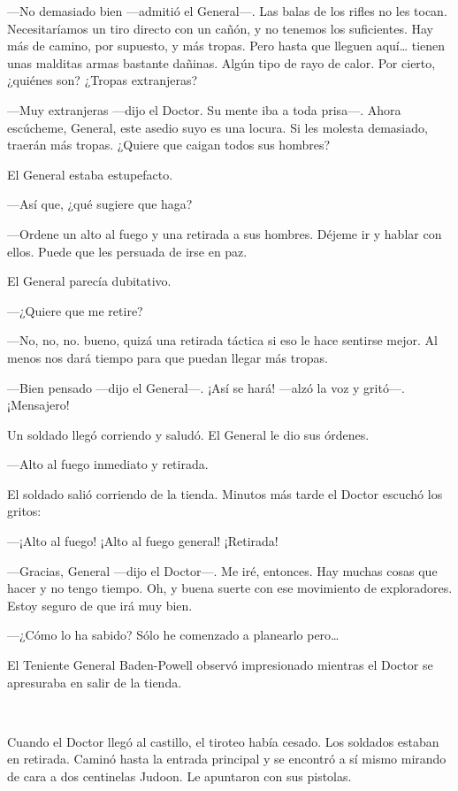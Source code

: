 ---No demasiado bien ---admitió el General---. Las balas de los rifles
no les tocan. Necesitaríamos un tiro directo con un cañón, y no tenemos
los suficientes. Hay más de camino, por supuesto, y más tropas. Pero
hasta que lleguen aquí\ldots{} tienen unas malditas armas bastante
dañinas. Algún tipo de rayo de calor. Por cierto, ¿quiénes son? ¿Tropas
extranjeras?

---Muy extranjeras ---dijo el Doctor. Su mente iba a toda prisa---.
Ahora escúcheme, General, este asedio suyo es una locura. Si les molesta
demasiado, traerán más tropas. ¿Quiere que caigan todos sus hombres?

El General estaba estupefacto.

---Así que, ¿qué sugiere que haga?

---Ordene un alto al fuego y una retirada a sus hombres. Déjeme ir y
hablar con ellos. Puede que les persuada de irse en paz.

El General parecía dubitativo.

---¿Quiere que me retire?

---No, no, no. bueno, quizá una retirada táctica si eso le hace sentirse
mejor. Al menos nos dará tiempo para que puedan llegar más tropas.

---Bien pensado ---dijo el General---. ¡Así se hará! ---alzó la voz y
gritó---. ¡Mensajero!

Un soldado llegó corriendo y saludó. El General le dio sus órdenes.

---Alto al fuego inmediato y retirada.

El soldado salió corriendo de la tienda. Minutos más tarde el Doctor
escuchó los gritos:

---¡Alto al fuego! ¡Alto al fuego general! ¡Retirada!

---Gracias, General ---dijo el Doctor---. Me iré, entonces. Hay muchas
cosas que hacer y no tengo tiempo. Oh, y buena suerte con ese movimiento
de exploradores. Estoy seguro de que irá muy bien.

---¿Cómo lo ha sabido? Sólo he comenzado a planearlo pero\ldots{}

El Teniente General Baden-Powell observó impresionado mientras el Doctor
se apresuraba en salir de la tienda.

~

Cuando el Doctor llegó al castillo, el tiroteo había cesado. Los
soldados estaban en retirada. Caminó hasta la entrada principal y se
encontró a sí mismo mirando de cara a dos centinelas Judoon. Le
apuntaron con sus pistolas.

